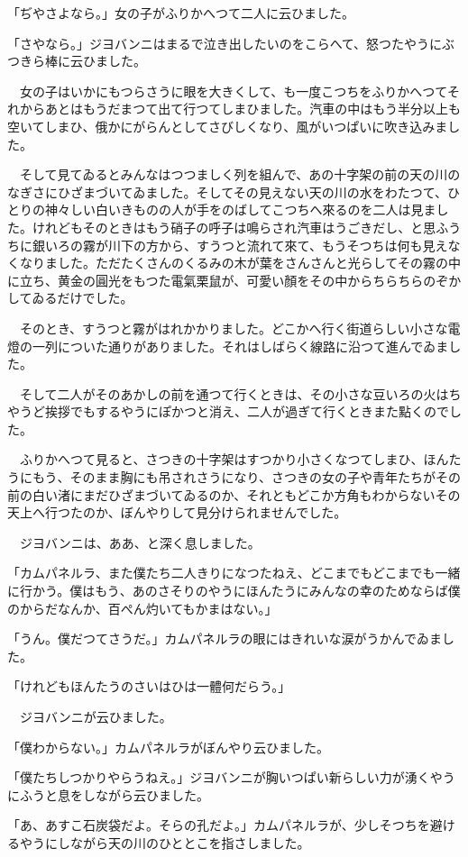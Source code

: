 \documentclass[tate,paper=b6j,jafontsize=9pt]{jlreq}
\begin{document}
「ぢやさよなら。」女の子がふりかへつて二人に云ひました。

「さやなら。」ジヨバンニはまるで泣き出したいのをこらへて、怒つたやうにぶつきら棒に云ひました。

　女の子はいかにもつらさうに眼を大きくして、も一度こつちをふりかへつてそれからあとはもうだまつて出て行つてしまひました。汽車の中はもう半分以上も空いてしまひ、俄かにがらんとしてさびしくなり、風がいつぱいに吹き込みました。

　そして見てゐるとみんなはつつましく列を組んで、あの十字架の前の天の川のなぎさにひざまづいてゐました。そしてその見えない天の川の水をわたつて、ひとりの神々しい白いきものの人が手をのばしてこつちへ來るのを二人は見ました。けれどもそのときはもう硝子の呼子は鳴らされ汽車はうごきだし、と思ふうちに銀いろの霧が川下の方から、すうつと流れて來て、もうそつちは何も見えなくなりました。ただたくさんのくるみの木が葉をさんさんと光らしてその霧の中に立ち、黄金の圓光をもつた電氣栗鼠が、可愛い顏をその中からちらちらのぞかしてゐるだけでした。

　そのとき、すうつと霧がはれかかりました。どこかへ行く街道らしい小さな電燈の一列についた通りがありました。それはしばらく線路に沿つて進んでゐました。

　そして二人がそのあかしの前を通つて行くときは、その小さな豆いろの火はちやうど挨拶でもするやうにぽかつと消え、二人が過ぎて行くときまた點くのでした。

　ふりかへつて見ると、さつきの十字架はすつかり小さくなつてしまひ、ほんたうにもう、そのまま胸にも吊されさうになり、さつきの女の子や青年たちがその前の白い渚にまだひざまづいてゐるのか、それともどこか方角もわからないその天上へ行つたのか、ぼんやりして見分けられませんでした。

　ジヨバンニは、ああ、と深く息しました。

「カムパネルラ、また僕たち二人きりになつたねえ、どこまでもどこまでも一緒に行かう。僕はもう、あのさそりのやうにほんたうにみんなの幸のためならば僕のからだなんか、百ぺん灼いてもかまはない。」

「うん。僕だつてさうだ。」カムパネルラの眼にはきれいな涙がうかんでゐました。

「けれどもほんたうのさいはひは一體何だらう。」

　ジヨバンニが云ひました。

「僕わからない。」カムパネルラがぼんやり云ひました。

「僕たちしつかりやらうねえ。」ジヨバンニが胸いつぱい新らしい力が湧くやうにふうと息をしながら云ひました。

「あ、あすこ石炭袋だよ。そらの孔だよ。」カムパネルラが、少しそつちを避けるやうにしながら天の川のひととこを指さしました。
\end{document}
